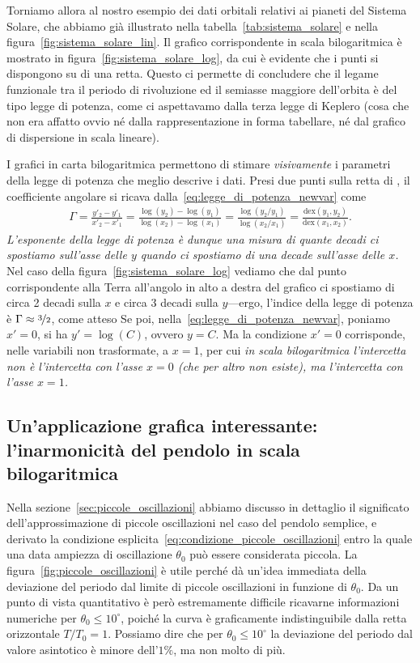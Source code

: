 Torniamo allora al nostro esempio dei dati orbitali relativi ai pianeti del
Sistema Solare, che abbiamo già illustrato nella
tabella~\ref{tab:sistema_solare} e nella figura~\ref{fig:sistema_solare_lin}.
Il grafico corrispondente in scala bilogaritmica è mostrato in
figura~\ref{fig:sistema_solare_log}, da cui è evidente che i punti si
dispongono su di una retta. Questo ci permette di concludere che il legame
funzionale tra il periodo di rivoluzione ed il semiasse maggiore dell'orbita
è del tipo legge di potenza, come ci aspettavamo dalla terza legge di
Keplero (cosa che non era affatto ovvio né dalla rappresentazione in forma
tabellare, né dal grafico di dispersione in scala lineare).

I grafici in carta bilogaritmica permettono di stimare \emph{visivamente} i
parametri della legge di potenza che meglio descrive i dati. Presi due punti sulla
retta di \fit, il coefficiente angolare si ricava dalla~\eqref{eq:legge_di_potenza_newvar}
come
\begin{align}\label{eq:legge_di_potenza_fit_index}
  \Gamma = \frac{y'_2 - y'_1}{x'_2 - x'_1} =
  \frac{\log(y_2) - \log(y_1)}{\log(x_2) - \log(x_1)} =
  \frac{\log(y_2/y_1)}{\log(x_2/x_1)} =
  \frac{\text{dex}(y_1, y_2)}{\text{dex}(x_1, x_2)}.
\end{align}
\emph{L'esponente della legge di potenza è dunque una misura di quante decadi ci
spostiamo sull'asse delle $y$ quando ci spostiamo di una decade sull'asse delle
$x$.} Nel caso della figura~\ref{fig:sistema_solare_log} vediamo che dal punto
corrispondente alla Terra all'angolo in alto a destra del grafico ci spostiamo
di circa 2 decadi sulla $x$ e circa 3 decadi sulla $y$---ergo, l'indice della
legge di potenza è $\Gamma \approx \nicefrac{3}{2}$, come atteso
Se poi, nella~\eqref{eq:legge_di_potenza_newvar}, poniamo $x' = 0$, si ha
$y' = \log(C)$, ovvero $y = C$. Ma la condizione $x' = 0$ corrisponde, nelle
variabili non trasformate, a $x = 1$, per cui \emph{in scala bilogaritmica
l'intercetta non è l'intercetta con l'asse $x = 0$ (che per altro non esiste),
ma l'intercetta con l'asse $x = 1$.}


\subsection{Un'applicazione grafica interessante: l'inarmonicità del pendolo
  in scala bilogaritmica}

Nella sezione~\ref{sec:piccole_oscillazioni} abbiamo discusso in dettaglio il
significato dell'approssimazione di piccole oscillazioni nel caso del pendolo
semplice, e derivato la condizione esplicita~\eqref{eq:condizione_piccole_oscillazioni}
entro la quale una data ampiezza di oscillazione $\theta_0$ può essere considerata
piccola.
La figura~\ref{fig:piccole_oscillazioni} è utile perché dà un'idea immediata
della deviazione del periodo dal limite di piccole oscillazioni in funzione di $\theta_0$.
Da un punto di vista quantitativo è però estremamente difficile ricavarne
informazioni numeriche per $\theta_0 \leq 10^\circ$, poiché la curva è
graficamente indistinguibile dalla retta orizzontale $T/T_0 = 1$. Possiamo
dire che per $\theta_0 \leq 10^\circ$ la deviazione del periodo dal valore
asintotico è minore dell'$1\%$, ma non molto di più.

